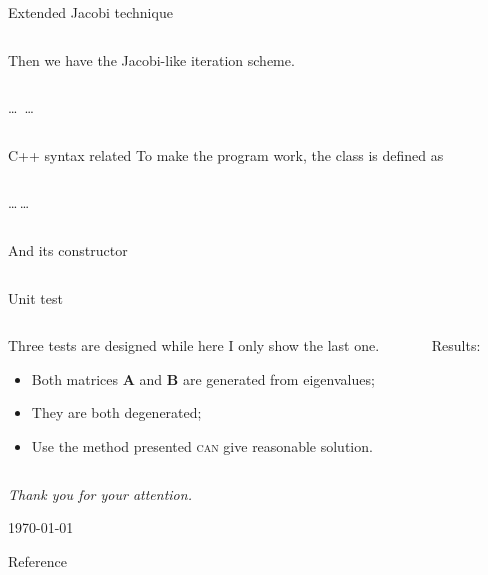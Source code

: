 \documentclass[aspectratio=169,10pt]{beamer}
\begin{document}
\begin{frame}[allowframebreaks]{Extended Jacobi technique}
            \framebreak
            \inputminted[linenos,firstline=52, lastline=65, breaklines]{cpp}{../simultaneousDiagonalization.cc}
   
   \framebreak         
    Then we have the Jacobi-like iteration scheme.

\inputminted[linenos,firstline=67, lastline=78, breaklines]{cpp}{../simultaneousDiagonalization.cc}
\ldots \, \ldots
\inputminted[linenos,firstline=87, lastline=87, breaklines]{cpp}{../simultaneousDiagonalization.cc}


\end{frame}

\begin{frame}[allowframebreaks=1]{C++ syntax related}
To make the program work, the class is defined as

\inputminted[linenos,firstline=6,lastline=17,breaklines]{cpp}{../simultaneousDiagonalization.h} 
\ldots\,\ldots
\inputminted[linenos,firstline=27,lastline=27,breaklines]{cpp}{../simultaneousDiagonalization.h} 
\framebreak
And its constructor

\inputminted[linenos,firstline=4, lastline=19, breaklines]{cpp}{../simultaneousDiagonalization.cc}
\end{frame}

\begin{frame}{Unit test}
\begin{columns}
	\begin{column}{0.3\textwidth}
Three tests are designed while here I only show the last one.
\begin{itemize}
	\item Both matrices $\mathbf{A}$ and $\mathbf{B}$ are generated from eigenvalues;
	\item They are both degenerated;
	\item Use the method presented \textsc{can} give reasonable solution. 
\end{itemize}
	\end{column}
	\begin{column}{0.7\textwidth}
		Results:
\scriptsize
\inputminted[linenos, breaklines]{text}{../test3.txt}
	\end{column}
\end{columns}

\end{frame}

\begin{frame}
\centering\itshape
{\large Thank you for your attention. }

\vspace{0.5in}

\small\today
\end{frame}
 
 \begin{frame}{Reference}
 
 
\end{frame}


    
\end{document}
